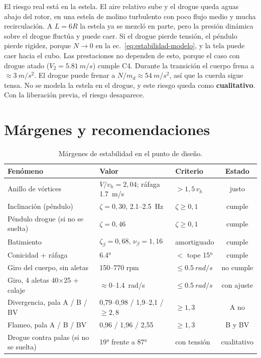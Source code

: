 El riesgo real está en la estela. El aire relativo sube y el drogue queda aguas abajo del
rotor, en una estela de molino turbulento con poco flujo medio y mucha recirculación. A
$L=6R$ la estela ya se mezcló en parte, pero la presión dinámica sobre el drogue
fluctúa y puede caer. Si el drogue pierde tensión, el péndulo pierde rigidez, porque
$N\to0$ en la ec.~\eqref{eq:estabilidad-modelo}, y la tela puede caer hacia el cubo. Las
prestaciones no dependen de esto, porque el caso con drogue atado ($V_2=\SI{5.81}{m/s}$)
cumple C4. Durante la transición el cuerpo frena a $\approx\SI{3}{m/s^2}$. El drogue
puede frenar a $N/m_d\approx\SI{54}{m/s^2}$, así que la cuerda sigue tensa. No se
modela la estela en el drogue, y este riesgo queda como \textbf{cualitativo}. Con la
liberación previa, el riesgo desaparece.

\section{Márgenes y recomendaciones}\label{sec:estabilidad-rec}

\begin{table}[H]
\centering\small
\caption{Márgenes de estabilidad en el punto de diseño.}
\label{tab:estabilidad-margenes}
\begin{tabularx}{\textwidth}{@{}lYYc@{}}
\toprule
Fenómeno & Valor & Criterio & Estado\\\midrule
Anillo de vórtices & $V/v_h=2{,}04$; ráfaga \SI{1.7}{m/s} & $>1{,}5\,v_h$ & justo\\
Inclinación (péndulo) & $\zeta=0{,}30$, \SI{2.1}{}--\SI{2.5}{Hz} & $\zeta\ge0{,}1$ & cumple\\
Péndulo drogue (si no se suelta) & $\zeta=0{,}46$ & $\zeta\ge0{,}1$ & cumple\\
Batimiento & $\zeta_\beta=0{,}68$, $\nu_\beta=1{,}16$ & amortiguado & cumple\\
Conicidad + ráfaga & \ang{6.4} & $<$ tope \ang{15} & cumple\\
Giro del cuerpo, sin aletas & 150--770 rpm & $\le\SI{0.5}{rad/s}$ & no cumple\\
Giro, 4 aletas 40×25 + calaje & $\approx0$--\SI{1.4}{rad/s} & $\le\SI{0.5}{rad/s}$ & con ajuste\\
Divergencia, pala A / B / BV & 0,79--0,98 / 1,9--2,1 / $\ge2{,}8$ & $\ge1{,}3$ & A no\\
Flameo, pala A / B / BV & 0,96 / 1,96 / 2,55 & $\ge1{,}3$ & B y BV\\
Drogue contra palas (si no se suelta) & \ang{19} frente a \ang{87} & con tensión & cualitativo\\
\bottomrule
\end{tabularx}
\end{table}


